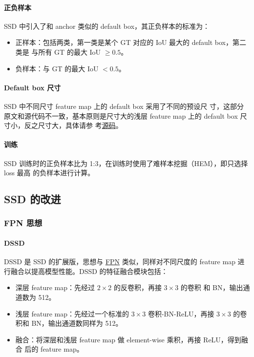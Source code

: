 \paragraph{正负样本}
SSD 中引入了和 anchor 类似的 default box，其正负样本的标准为：

\begin{itemize}
  \item 正样本：包括两类，第一类是某个 GT 对应的 IoU 最大的 default box，第二类是
    与所有 GT 的最大 IoU $ \geq 0.5 $。
  \item 负样本：与 GT 的最大 IoU $ < 0.5 $。
\end{itemize}

\paragraph{Default box 尺寸}
SSD 中不同尺寸 feature map 上的 default box 采用了不同的预设尺
寸，这部分原文和源代码不一致，基本原则是尺寸大的浅层 feature map 上的 default
box 尺寸小，反之尺寸大，具体请参
考\href{https://github.com/weiliu89/caffe/blob/ssd/examples/ssd/ssd_pascal.py}{源码}。

\paragraph{训练}
SSD 训练时的正负样本比为 1:3，在训练时使用了难样本挖掘（HEM），即只选择 loss 最高
的负样本进行计算。

\subsection{SSD 的改进}
\subsubsection{FPN 思想}
\paragraph{DSSD}
DSSD 是 SSD 的扩展版，思想与 \hyperref[sec:FPN]{FPN} 类似，同样对不同尺度的
feature map 进行融合以提高模型性能。DSSD 的特征融合模块包括：

\begin{itemize}
  \item 深层 feature map：先经过 $2 \times 2$ 的反卷积，再接 $3 \times 3$ 的卷积
    和 BN，输出通道数为 512。
  \item 浅层 feature map：先经过一个标准的 $3 \times 3$ 卷积-BN-ReLU，再接 $3
    \times 3$ 的卷积和 BN，输出通道数同样为 512。
  \item 融合：将深层和浅层 feature map 做 element-wise 乘积，再接 ReLU，得到融合
    后的 feature map。
\end{itemize}

